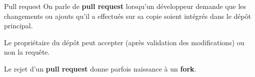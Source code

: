 \documentclass{beamer}
\begin{document}
\begin{frame}{Pull request}
  On parle de \textbf{pull request} lorsqu'un développeur demande que les changements ou ajouts qu'il a effectués sur sa copie soient intégrés dans le dépôt principal.

  Le propriétaire du dépôt peut accepter (après validation des modifications) ou non la requête.

  Le rejet d'un \textbf{pull request} donne parfois naissance à un \textbf{fork}.
\end{frame}
\end{document}
